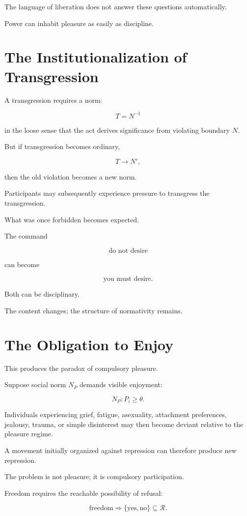 \documentclass[11pt,oneside]{book}
\theoremstyle{definition}
\theoremstyle{remark}
\newcommand{\R}{\mathcal{R}}
\begin{document}
The language of liberation does not answer these questions automatically.

Power can inhabit pleasure as easily as discipline.

\section{The Institutionalization of Transgression}

A transgression requires a norm:

\[
T=N^{-1}
\]

in the loose sense that the act derives significance from violating boundary \(N\).

But if transgression becomes ordinary,

\[
T\rightarrow N',
\]

then the old violation becomes a new norm.

Participants may subsequently experience pressure to transgress the transgression.

What was once forbidden becomes expected.

The command

\[
\text{do not desire}
\]

can become

\[
\text{you must desire}.
\]

Both can be disciplinary.

The content changes; the structure of normativity remains.

\section{The Obligation to Enjoy}

This produces the paradox of compulsory pleasure.

Suppose social norm \(N_P\) demands visible enjoyment:

\[
N_P:
P_i\geq\theta.
\]

Individuals experiencing grief, fatigue, asexuality, attachment preferences, jealousy, trauma, or simple disinterest may then become deviant relative to the pleasure regime.

A movement initially organized against repression can therefore produce new repression.

The problem is not pleasure; it is compulsory participation.

Freedom requires the reachable possibility of refusal:

\[
\text{freedom}
\Rightarrow
\{\text{yes},\text{no}\}
\subseteq
\R.
\]
\end{document}
